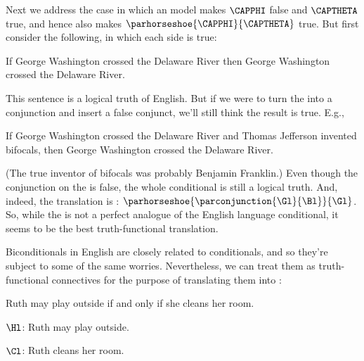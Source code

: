 Next we address the case in which an \GSL{} model makes $\CAPPHI$ false and $\CAPTHETA$ true, and hence also makes $\parhorseshoe{\CAPPHI}{\CAPTHETA}$ true.  But first consider the following, in which each side is true:

\begin{menumerate}
	\item If George Washington crossed the Delaware River then George Washington crossed the Delaware River.
\end{menumerate}

\noindent{}This sentence is a logical truth of English.  But if we were to turn the  into a conjunction and insert a false conjunct, we'll still think the result is true.  E.g.,

\begin{menumerate}
	\item If George Washington crossed the Delaware River and Thomas Jefferson invented bifocals, then George Washington crossed the Delaware River.
\end{menumerate}

\noindent{}(The true inventor of bifocals was probably Benjamin Franklin.)  Even though the conjunction on the  is false, the whole conditional is still a logical truth.  And, indeed, the \GSL{} translation is : $\parhorseshoe{\parconjunction{\Gl}{\Bl}}{\Gl}$.  So, while the \mention{$\HORSESHOE$} is not a perfect analogue of the English language conditional, it seems to be the best truth-functional translation.

Biconditionals in English are closely related to conditionals, and so they're subject to some of the same worries.  Nevertheless, we can treat them as truth-functional connectives for the purpose of translating them into \GSL{}:

\begin{menumerate}
	\item Ruth may play outside if and only if she cleans her room.
\end{menumerate}

	\begin{description}[itemsep=0em]
		\item[Translation Key:] \hfill{} 
		\begin{description}[itemsep=0em]
			\item $\Hl$: Ruth may play outside.
			\item $\Cl$: Ruth cleans her room.
		\end{description} 
	\end{description}

